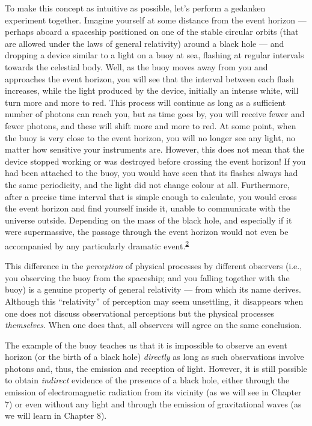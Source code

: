 To make this concept as intuitive as possible, let's perform a gedanken experiment
together. Imagine yourself at some distance from the event horizon --- perhaps aboard a
spaceship positioned on one of the stable circular orbits (that are
allowed under the laws of general relativity) around a black hole --- and dropping a
device similar to a light on a buoy at sea, flashing at regular intervals towards the
celestial body. Well, as the buoy moves away from you and approaches the event horizon,
you will see that the interval between each flash increases, while the light produced by
the device, initially an intense white, will turn more and more to red. This process
will continue as long as a sufficient number of photons can reach you, but as time goes
by, you will receive fewer and fewer photons, and these will shift more and more to red.
At some point, when the buoy is very close to the event horizon, you will no longer see
any light, no matter how sensitive your instruments are. However, this does not mean
that the device stopped working or was destroyed before crossing the event horizon! If
you had been attached to the buoy, you would have seen that its flashes always had the
same periodicity, and the light did not change colour at all. Furthermore, after a
precise time interval that is simple enough to calculate, you would cross the event
horizon and find yourself inside it, unable to communicate with the universe outside.
Depending on the mass of the black hole, and especially if it were
supermassive, the passage through the event horizon would not even be
accompanied by any particularly dramatic event.\textsuperscript{\hyperlink{note:06-02}{2}}

This difference in the \emph{perception} of physical processes by
different observers (i.e., you observing the buoy from the spaceship; and you falling
together with the buoy) is a genuine property of general relativity --- from which its
name derives. Although this ``relativity'' of perception may seem
unsettling, it disappears when one does not discuss observational
perceptions but the physical processes \emph{themselves}. When one does that, all
observers will agree on the same conclusion.

The example of the buoy teaches us that it is impossible to observe an event horizon (or
the birth of a black hole) \emph{directly} as long as such observations involve photons
and, thus, the emission and reception of light. However, it is still possible to obtain
\emph{indirect} evidence of the presence of a black hole, either through the emission of
electromagnetic radiation from its vicinity (as we will see in Chapter 7) or even
without any light and through the emission of gravitational waves (as we will learn in
Chapter 8).

